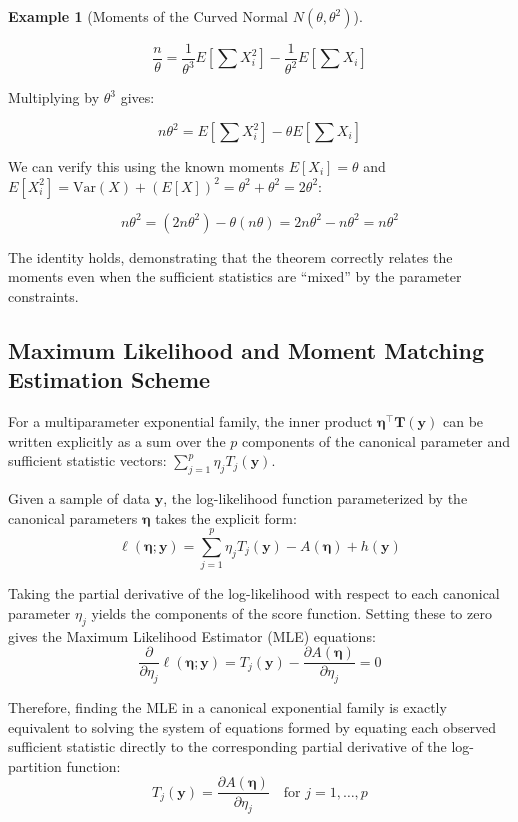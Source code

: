 \documentclass[
  letterpaper,
  DIV=11,
  numbers=noendperiod]{scrreprt}
\renewcommand{\[}{\begin{equation}}
\renewcommand{\]}{\end{equation}}
\theoremstyle{definition}
\theoremstyle{plain}
\theoremstyle{plain}
\theoremstyle{plain}
\theoremstyle{definition}
\newtheorem{example}{Example}[chapter]
\theoremstyle{plain}
\theoremstyle{remark}
\begin{document}
\begin{example}[Moments of the Curved Normal
\(N(\theta, \theta^2)\)]
\begin{enumerate}
  \[
  \frac{n}{\theta} = \frac{1}{\theta^3} E\left[\sum X_i^2\right] - \frac{1}{\theta^2} E\left[\sum X_i\right]
  \]

  Multiplying by \(\theta^3\) gives:

  \[
  n\theta^2 = E\left[\sum X_i^2\right] - \theta E\left[\sum X_i\right]
  \]

  We can verify this using the known moments \(E[X_i] = \theta\) and
  \(E[X_i^2] = \text{Var}(X) + (E[X])^2 = \theta^2 + \theta^2 = 2\theta^2\):

  \[
  n\theta^2 = (2n\theta^2) - \theta(n\theta) = 2n\theta^2 - n\theta^2 = n\theta^2
  \]

  The identity holds, demonstrating that the theorem correctly relates
  the moments even when the sufficient statistics are ``mixed'' by the
  parameter constraints.
\end{enumerate}

\end{example}

\subsection{Maximum Likelihood and Moment Matching Estimation
Scheme}\label{maximum-likelihood-and-moment-matching-estimation-scheme}

For a multiparameter exponential family, the inner product
\(\boldsymbol{\eta}^\top \mathbf{T}(\mathbf{y})\) can be written
explicitly as a sum over the \(p\) components of the canonical parameter
and sufficient statistic vectors:
\(\sum_{j=1}^p \eta_j T_j(\mathbf{y})\).

Given a sample of data \(\mathbf{y}\), the log-likelihood function
parameterized by the canonical parameters \(\boldsymbol{\eta}\) takes
the explicit form: \[
\ell(\boldsymbol{\eta}; \mathbf{y}) = \sum_{j=1}^p \eta_j T_j(\mathbf{y}) - A(\boldsymbol{\eta}) + h(\mathbf{y})
\]

Taking the partial derivative of the log-likelihood with respect to each
canonical parameter \(\eta_j\) yields the components of the score
function. Setting these to zero gives the Maximum Likelihood Estimator
(MLE) equations: \[
\frac{\partial}{\partial \eta_j} \ell(\boldsymbol{\eta}; \mathbf{y}) = T_j(\mathbf{y}) - \frac{\partial A(\boldsymbol{\eta})}{\partial \eta_j} = 0
\]

Therefore, finding the MLE in a canonical exponential family is exactly
equivalent to solving the system of equations formed by equating each
observed sufficient statistic directly to the corresponding partial
derivative of the log-partition function: \[
T_j(\mathbf{y}) = \frac{\partial A(\boldsymbol{\eta})}{\partial \eta_j} \quad \text{for } j = 1, \dots, p
\]
\end{document}
